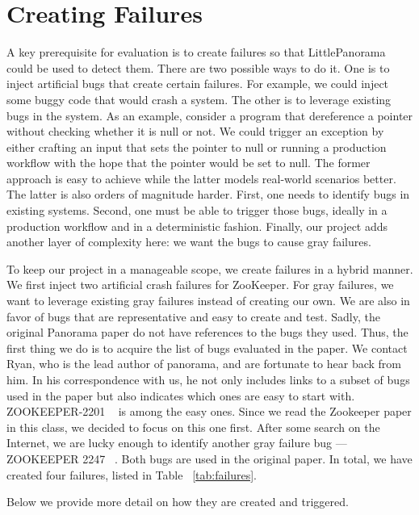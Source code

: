 \section{Creating Failures}
\label{sec:reproducebugs}
A key prerequisite for evaluation is to create failures so that LittlePanorama could be used to detect them. There are two possible ways to do it. One is to inject artificial bugs that create certain failures. For example, we could inject some buggy code that would crash a system. The other is to leverage existing bugs in the system. As an example, consider a program that dereference a pointer without checking whether it is null or not. We could trigger an exception by either crafting an input that sets the pointer to null or running a production workflow with the hope that the pointer would be set to null. The former approach is easy to achieve while the latter models real-world scenarios better. The latter is also orders of magnitude harder. First, one needs to identify bugs in existing systems. Second, one must be able to trigger those bugs, ideally in a production workflow and in a deterministic fashion. Finally, our project adds another layer of complexity here: we want the bugs to cause gray failures. 

To keep our project in a manageable scope, we create failures in a hybrid manner. We first inject two artificial crash failures for ZooKeeper. For gray failures, we want to leverage existing gray failures instead of creating our own. We are also in favor of bugs that are representative and easy to create and test. Sadly, the original Panorama paper do not have references to the bugs they used. Thus, the first thing we do is to acquire the list of bugs evaluated in the paper. We contact Ryan, who is the lead author of panorama, and are fortunate to hear back from him. In his correspondence with us, he not only includes links to a subset of bugs used in the paper but also indicates which ones are easy to start with. ZOOKEEPER-2201 ~\cite{httpsiss99:online} is among the easy ones. Since we read the Zookeeper paper in this class, we decided to focus on this one first. After some search on the Internet, we are lucky enough to identify another gray failure bug --- ZOOKEEPER 2247 ~\cite{ZOOKEEPER2247:online}. Both bugs are used in the original paper. In total, we have created four failures, listed in Table ~\ref{tab:failures}. 

Below we provide more detail on how they are created and triggered.

